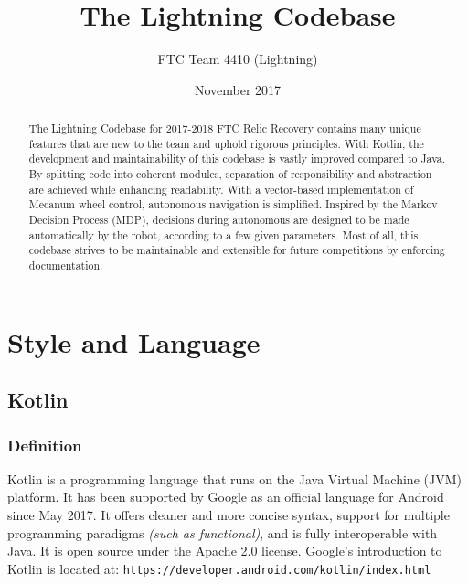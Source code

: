 \documentclass[letterpaper]{article}
\begin{document}
\title{The Lightning Codebase}
\author{FTC Team 4410 (Lightning)}
\date{November 2017}
\maketitle

\begin{abstract}
The Lightning Codebase for 2017-2018 FTC Relic Recovery contains many unique features that are new to the team and uphold rigorous principles. With Kotlin, the development and maintainability of this codebase is vastly improved compared to Java. By splitting code into coherent modules, separation of responsibility and abstraction are achieved while enhancing readability. With a vector-based implementation of Mecanum wheel control, autonomous navigation is simplified. Inspired by the Markov Decision Process (MDP), decisions during autonomous are designed to be made automatically by the robot, according to a few given parameters. Most of all, this codebase strives to be maintainable and extensible for future competitions by enforcing documentation.
\end{abstract}
\section{Style and Language}

\subsection{Kotlin}

\subsubsection{Definition}
Kotlin is a programming language that runs on the Java Virtual Machine (JVM) platform. It has been supported by Google as an official language for Android since May 2017. It offers cleaner and more concise syntax, support for multiple programming paradigms \textit{(such as functional)}, and is fully interoperable with Java. It is open source under the Apache 2.0 license. Google's introduction to Kotlin is located at: \texttt{https://developer.android.com/kotlin/index.html}
\end{document}
